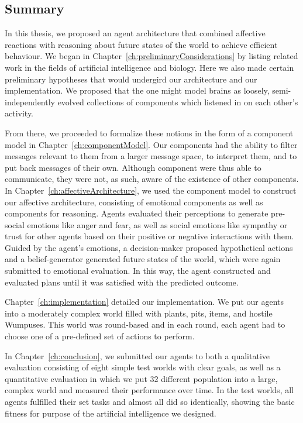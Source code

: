 \subsection{Summary}

In this thesis, we proposed an agent architecture that combined affective reactions with reasoning about future states of the world to achieve efficient behaviour. We began in Chapter~\ref{ch:preliminaryConsiderations} by listing related work in the fields of artificial intelligence and biology. Here we also made certain preliminary hypotheses that would undergird our architecture and our implementation. We proposed that the one might model brains as loosely, semi-independently evolved collections of components which listened in on each other's activity.

From there, we proceeded to formalize these notions in the form of a component model in Chapter~\ref{ch:componentModel}. Our components had the ability to filter messages relevant to them from a larger message space, to interpret them, and to put back messages of their own. Although component were thus able to communicate, they were not, as such, aware of the existence of other components. In Chapter~\ref{ch:affectiveArchitecture}, we used the component model to construct our affective architecture, consisting of emotional components as well as components for reasoning. Agents evaluated their perceptions to generate pre-social emotions like anger and fear, as well as social emotions like sympathy or trust for other agents based on their positive or negative interactions with them. Guided by the agent's emotions, a decision-maker proposed hypothetical actions and a belief-generator generated future states of the world, which were again submitted to emotional evaluation. In this way, the agent constructed and evaluated plans until it was satisfied with the predicted outcome.

Chapter~\ref{ch:implementation} detailed our implementation. We put our agents into a moderately complex world filled with plants, pits, items, and hostile Wumpuses. This world was round-based and in each round, each agent had to choose one of a pre-defined set of actions to perform.

In Chapter~\ref{ch:conclusion}, we submitted our agents to both a qualitative evaluation consisting of eight simple test worlds with clear goals, as well as a quantitative evaluation in which we put 32 different population into a large, complex world and measured their performance over time. In the test worlds, all agents fulfilled their set tasks and almost all did so identically, showing the basic fitness for purpose of the artificial intelligence we designed.

